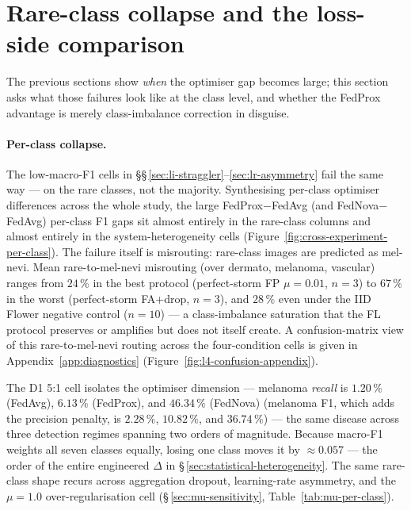 \documentclass[11pt,a4paper]{report}
\begin{document}


\section{Rare-class collapse and the loss-side comparison}
\label{sec:rare-class-collapse}

The previous sections show \emph{when} the optimiser gap becomes large; this
section asks what those failures look like at the class level, and whether the
FedProx advantage is merely class-imbalance correction in disguise.

\paragraph{Per-class collapse.}

The low-macro-F1 cells in \S\S\,\ref{sec:li-straggler}--\ref{sec:lr-asymmetry}
fail the same way --- on the rare classes, not the majority. Synthesising
per-class optimiser differences across the whole study, the large
FedProx$-$FedAvg (and FedNova$-$FedAvg) per-class F1 gaps sit almost entirely in
the rare-class columns and almost entirely in the system-heterogeneity cells
(Figure~\ref{fig:cross-experiment-per-class}). The failure itself is misrouting:
rare-class images are predicted as mel-nevi. Mean rare-to-mel-nevi
misrouting (over dermato, melanoma, vascular) ranges from $24\,\%$ in the
best protocol (perfect-storm FP $\mu = 0.01$, $n=3$) to $67\,\%$ in the
worst (perfect-storm FA+drop, $n=3$), and $28\,\%$ even under the IID
Flower negative control ($n=10$) --- a class-imbalance saturation that the
FL protocol preserves or amplifies but does not itself create. A confusion-matrix
view of this rare-to-mel-nevi routing across the four-condition cells is given in
Appendix~\ref{app:diagnostics} (Figure~\ref{fig:l4-confusion-appendix}).

The D1 5:1 cell isolates the optimiser dimension --- melanoma \emph{recall} is
$1.20\,\%$ (FedAvg), $6.13\,\%$ (FedProx), and $46.34\,\%$ (FedNova) (melanoma F1,
which adds the precision penalty, is $2.28\,\%$, $10.82\,\%$, and $36.74\,\%$) --- the
same disease across three detection regimes spanning two orders of magnitude. Because
macro-F1 weights all seven classes equally, losing one class moves it by
$\approx 0.057$ --- the order of the entire engineered $\Delta$ in
\S\,\ref{sec:statistical-heterogeneity}. The same rare-class shape recurs across
aggregation dropout, learning-rate asymmetry, and the $\mu = 1.0$
over-regularisation cell (\S\,\ref{sec:mu-sensitivity}, Table~\ref{tab:mu-per-class}).
\end{document}
